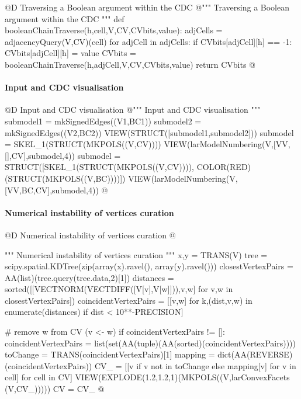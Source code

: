 \documentclass[11pt,oneside]{article}	%
\begin{document}
@D Traversing a Boolean argument within the CDC
@{""" Traversing a Boolean argument within the CDC """
def booleanChainTraverse(h,cell,V,CV,CVbits,value):
	adjCells = adjacencyQuery(V,CV)(cell)
	for adjCell in adjCells: 
		if CVbits[adjCell][h] == -1:
			CVbits[adjCell][h] = value
			CVbits = booleanChainTraverse(h,adjCell,V,CV,CVbits,value)
	return CVbits
@}


\paragraph{Input and CDC visualisation}

@D Input and CDC visualisation
@{""" Input and CDC visualisation """
submodel1 = mkSignedEdges((V1,BC1))
submodel2 = mkSignedEdges((V2,BC2))
VIEW(STRUCT([submodel1,submodel2]))
submodel = SKEL_1(STRUCT(MKPOLS((V,CV))))
VIEW(larModelNumbering(V,[VV,[],CV],submodel,4))
submodel = STRUCT([SKEL_1(STRUCT(MKPOLS((V,CV)))), COLOR(RED)(STRUCT(MKPOLS((V,BC))))])
VIEW(larModelNumbering(V,[VV,BC,CV],submodel,4))
@}

\paragraph{Numerical instability of vertices curation}

@D Numerical instability of vertices curation
@{""" Numerical instability of vertices curation """
x,y = TRANS(V)
tree = scipy.spatial.KDTree(zip(array(x).ravel(), array(y).ravel()))
closestVertexPairs = AA(list)(tree.query(tree.data,2)[1])
distances = sorted([[VECTNORM(VECTDIFF([V[v],V[w]])),v,w] for v,w in closestVertexPairs])
coincidentVertexPairs = [[v,w] for k,(dist,v,w) in enumerate(distances) if dist < 10**-PRECISION]

# remove w from CV (v <- w)
if coincidentVertexPairs != []:
	coincidentVertexPairs = list(set(AA(tuple)(AA(sorted)(coincidentVertexPairs))))
	toChange = TRANS(coincidentVertexPairs)[1]
	mapping = dict(AA(REVERSE)(coincidentVertexPairs))
	CV_ = [[v  if v not in toChange else mapping[v] for v in cell] for cell in CV]
	VIEW(EXPLODE(1.2,1.2,1)(MKPOLS((V,larConvexFacets (V,CV_)))))
	CV = CV_
@}
\end{document}
